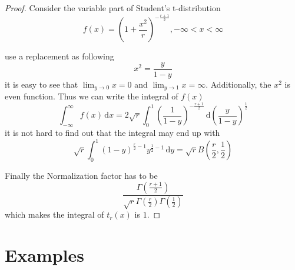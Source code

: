 \begin{proof}
    Consider the variable part of Student's t-distribution
    \begin{equation*}
        f(x) = (1+\frac{x^2}{r})^{-\frac{r+1}{2}}, -\infty < x < \infty
    \end{equation*}

    use a replacement as following
    \begin{equation*}
        x^2 = \frac{y}{1-y}
    \end{equation*}
    it is easy to see that $\lim_{y \to 0} x = 0$ and $\lim_{y \to 1} x = \infty$.
    Additionally, the $x^2$ is even function.
    Thus we can write the integral of $f(x)$
    \begin{equation*}
        \int_{-\infty}^{\infty} f(x) \,\mathrm{d}x =
        2 \sqrt{r} \int_{0}^{1} (\frac{1}{1-y})^{-\frac{r+1}{2}} \,\mathrm{d} (\frac{y}{1-y})^\frac{1}{2}
    \end{equation*}
    it is not hard to find out that the integral may end up with
    \begin{equation*}
        \sqrt{r} \int_{0}^{1} (1-y)^{\frac{r}{2}-1} y^{\frac{1}{2}-1} \,\mathrm{d}y =
        \sqrt{r} B(\frac{r}{2}, \frac{1}{2})
    \end{equation*}

    Finally the Normalization factor has to be
    \begin{equation*}
        \frac{\Gamma(\frac{r+1}{2})}{\sqrt{r} \Gamma(\frac{r}{2}) \Gamma(\frac{1}{2})}
    \end{equation*}
    which makes the integral of $t_r(x)$ is $1$.

\end{proof}


\section{Examples}


